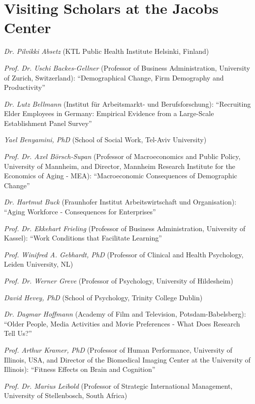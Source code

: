 \section{Visiting Scholars at the Jacobs Center}

\textit{Dr. Pilvikki Absetz} (KTL Public Health Institute Helsinki, Finland)

 
\textit{Prof. Dr. Uschi Backes-Gellner} (Professor of Business Administration, University of Zurich, Switzerland): ``Demographical Change, Firm Demography and Productivity''


\textit{Dr. Lutz Bellmann} (Institut f\"ur Arbeitsmarkt- und Berufsforschung): ``Recruiting Elder Employees in Germany: Empirical Evidence from a Large-Scale Establishment Panel Survey''


\textit{Yael Benyamini, PhD} (School of Social Work, Tel-Aviv University)


\textit{Prof. Dr. Axel B\"orsch-Supan} (Professor of Macroeconomics and Public Policy, University of Mannheim, and Director, Mannheim Research Institute for the Economics of Aging - MEA): ``Macroeconomic Consequences of Demographic Change''


\textit{Dr. Hartmut Buck} (Fraunhofer Institut Arbeitswirtschaft und Organisation): ``Aging Workforce - Consequences for Enterprises''


\textit{Prof. Dr. Ekkehart Frieling} (Professor of Business Administration, University of Kassel): ``Work Conditions that Facilitate Learning''


\textit{Prof. Winifred A. Gebhardt, PhD} (Professor of Clinical and Health Psychology, Leiden University, NL)


\textit{Prof. Dr. Werner Greve} (Professor of Psychology, University of Hildesheim)


\textit{David Hevey, PhD} (School of Psychology, Trinity College Dublin)


\textit{Dr. Dagmar Hoffmann} (Academy of Film and Television, Potsdam-Babelsberg): ``Older People, Media Activities and Movie Preferences - What Does Research Tell Us?''


\textit{Prof. Arthur Kramer, PhD} (Professor of Human Performance, University of Illinois, USA, and Director of the Biomedical Imaging Center at the University of Illinois): ``Fitness Effects on Brain and Cognition''


\textit{Prof. Dr. Marius Leibold} (Professor of Strategic International Management, University of Stellenbosch, South Africa)


